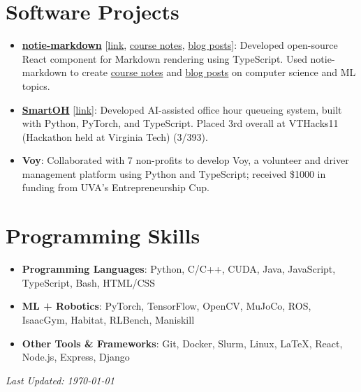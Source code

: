 \documentclass[letterpaper,11pt]{article}
\newcommand{\linkhref}[2]{\textcolor{linkblue}{\href{#1}{#2}}}
\begin{document}
\section{Software Projects}
\begin{itemize}[label={}, leftmargin=0pt]
  \item \textbf{\href{https://notie-markdown.vercel.app/}{notie-markdown}} [\linkhref{https://notie-markdown.vercel.app/}{link}, \linkhref{https://www.brandonyifanyang.com/notes}{course notes}, \linkhref{https://www.brandonyifanyang.com/blog}{blog posts}]: Developed open-source React component for Markdown rendering using TypeScript. Used notie-markdown to create \href{https://www.brandonyifanyang.com/notes}{course notes} and \href{https://www.brandonyifanyang.com/blog}{blog posts} on computer science and ML topics.
  \item \textbf{\href{https://github.com/ewei2406/SmartOH}{SmartOH}} [\linkhref{https://github.com/ewei2406/SmartOH}{link}]: Developed AI-assisted office hour queueing system, built with Python, PyTorch, and TypeScript. Placed 3rd overall at VTHacks11 (Hackathon held at Virginia Tech) (3/393).
  \item \textbf{Voy}: Collaborated with 7 non-profits to develop Voy, a volunteer and driver management platform using Python and TypeScript; received \$1000 in funding from UVA's Entrepreneurship Cup.
\end{itemize}

\section{Programming Skills}
\begin{itemize}[label={}, leftmargin=0pt]
  \item \textbf{Programming Languages}: Python, C/C++, CUDA, Java, JavaScript, TypeScript, Bash, HTML/CSS
  \item \textbf{ML + Robotics}: PyTorch, TensorFlow, OpenCV, MuJoCo, ROS, IsaacGym, Habitat, RLBench, Maniskill
  \item \textbf{Other Tools \& Frameworks}: Git, Docker, Slurm, Linux, \LaTeX, React, Node.js, Express, Django
\end{itemize}

\vfill
\noindent\textit{\small Last Updated: \today}
\end{document}
